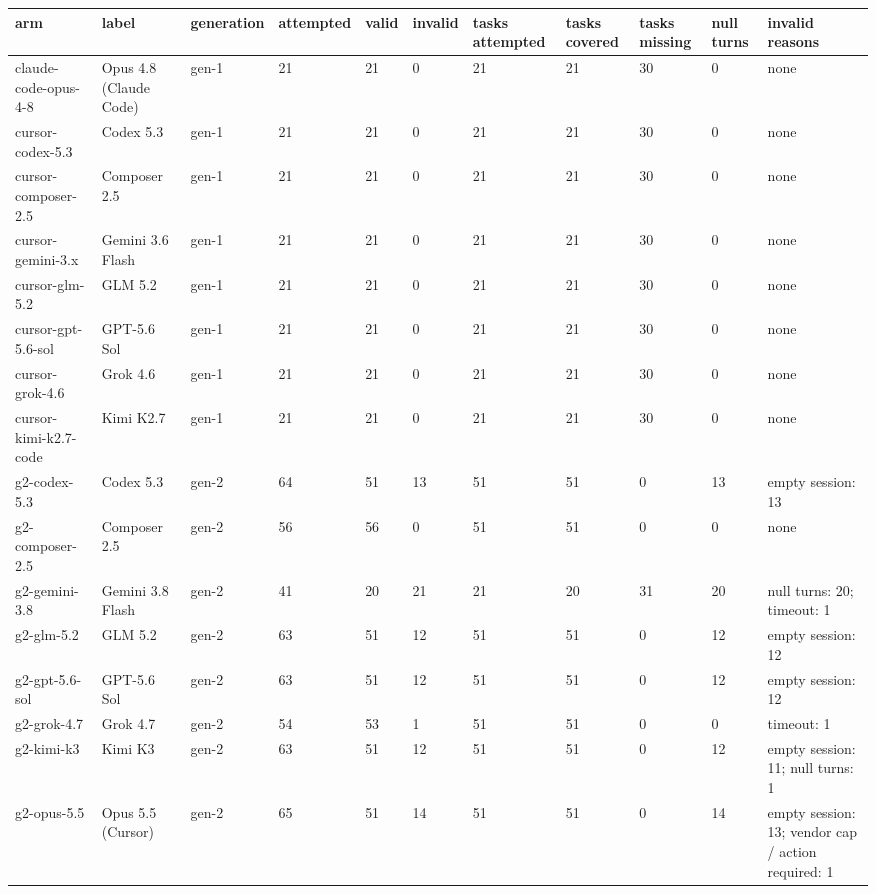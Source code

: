 \begin{tabular}{lllllllllll}
\toprule
arm & label & generation & attempted & valid & invalid & tasks attempted & tasks covered & tasks missing & null turns & invalid reasons \\
\midrule
claude-code-opus-4-8 & Opus 4.8 (Claude Code) & gen-1 & 21 & 21 & 0 & 21 & 21 & 30 & 0 & none \\
cursor-codex-5.3 & Codex 5.3 & gen-1 & 21 & 21 & 0 & 21 & 21 & 30 & 0 & none \\
cursor-composer-2.5 & Composer 2.5 & gen-1 & 21 & 21 & 0 & 21 & 21 & 30 & 0 & none \\
cursor-gemini-3.x & Gemini 3.6 Flash & gen-1 & 21 & 21 & 0 & 21 & 21 & 30 & 0 & none \\
cursor-glm-5.2 & GLM 5.2 & gen-1 & 21 & 21 & 0 & 21 & 21 & 30 & 0 & none \\
cursor-gpt-5.6-sol & GPT-5.6 Sol & gen-1 & 21 & 21 & 0 & 21 & 21 & 30 & 0 & none \\
cursor-grok-4.6 & Grok 4.6 & gen-1 & 21 & 21 & 0 & 21 & 21 & 30 & 0 & none \\
cursor-kimi-k2.7-code & Kimi K2.7 & gen-1 & 21 & 21 & 0 & 21 & 21 & 30 & 0 & none \\
g2-codex-5.3 & Codex 5.3 & gen-2 & 64 & 51 & 13 & 51 & 51 & 0 & 13 & empty session: 13 \\
g2-composer-2.5 & Composer 2.5 & gen-2 & 56 & 56 & 0 & 51 & 51 & 0 & 0 & none \\
g2-gemini-3.8 & Gemini 3.8 Flash & gen-2 & 41 & 20 & 21 & 21 & 20 & 31 & 20 & null turns: 20; timeout: 1 \\
g2-glm-5.2 & GLM 5.2 & gen-2 & 63 & 51 & 12 & 51 & 51 & 0 & 12 & empty session: 12 \\
g2-gpt-5.6-sol & GPT-5.6 Sol & gen-2 & 63 & 51 & 12 & 51 & 51 & 0 & 12 & empty session: 12 \\
g2-grok-4.7 & Grok 4.7 & gen-2 & 54 & 53 & 1 & 51 & 51 & 0 & 0 & timeout: 1 \\
g2-kimi-k3 & Kimi K3 & gen-2 & 63 & 51 & 12 & 51 & 51 & 0 & 12 & empty session: 11; null turns: 1 \\
g2-opus-5.5 & Opus 5.5 (Cursor) & gen-2 & 65 & 51 & 14 & 51 & 51 & 0 & 14 & empty session: 13; vendor cap / action required: 1 \\
\bottomrule
\end{tabular}
